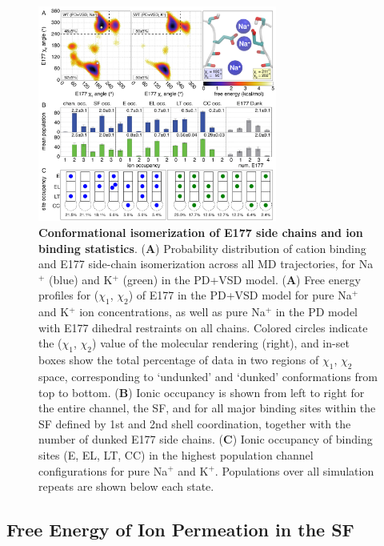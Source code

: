 \begin{refsection}
\begin{figure}[!htb]
\centering
\includegraphics[width=0.7\textwidth]{nav2/Nav2Fig2}
\caption[Conformational isomerization of E177 side chains and ion binding statistics]{\textbf{Conformational isomerization of E177 side chains and ion binding statistics}. (\textbf{A}) Probability distribution of cation binding and E177 side-chain isomerization across all MD trajectories, for Na$^+$ (blue) and K$^+$ (green) in the PD+VSD model. (\textbf{A}) Free energy profiles for ($\chi_1$, $\chi_2$) of E177 in the PD+VSD model for pure Na$^+$ and K$^+$ ion concentrations, as well as pure Na$^+$ in the PD model with E177 dihedral restraints on all chains. Colored circles indicate the ($\chi_1$, $\chi_2$) value of the molecular rendering (right), and in-set boxes show the total percentage of data in two regions of $\chi_1$, $\chi_2$ space, corresponding to `undunked' and `dunked' conformations from top to bottom. (\textbf{B}) Ionic occupancy is shown from left to right for the entire channel, the SF, and for all major binding sites within the SF defined by 1st and 2nd shell coordination, together with the number of dunked E177 side chains. (\textbf{C}) Ionic occupancy of binding sites (E, EL, LT, CC) in the highest population channel configurations for pure Na$^+$ and K$^+$. Populations over all simulation repeats are shown below each state.}
\label{fig:nav2fig2}
\end{figure}

\subsection{Free Energy of Ion Permeation in the SF}


\end{refsection}
